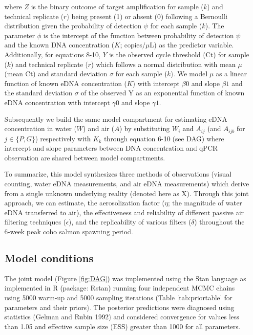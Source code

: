 \documentclass{article}
\begin{document}
where $Z$ is the binary outcome of target amplification for sample ($k$) and technical replicate ($r$) being present (1) or absent (0) following a Bernoulli distribution given the probability of detection $\psi$ for each sample ($k$). The parameter $\phi$ is the intercept of the function between probability of detection $\psi$ and the known DNA concentration ($K$; copies/$\mu$L) as the predictor variable. Additionally, for equations 8-10, $Y$ is the observed cycle threshold (Ct) for sample ($k$) and technical replicate ($r$) which follows a normal distribution with mean $\mu$ (mean Ct) and standard deviation $\sigma$ for each sample ($k$). We model $\mu$ as a linear function of known eDNA concentration ($K$) with intercept $\beta0$ and slope $\beta1$ and the standard deviation $\sigma$ of the observed Y as an exponential function of known eDNA concentration with intercept $\gamma0$ and slope $\gamma1$.

Subsequently we build the same model compartment for estimating eDNA concentration in water ($W$) and air ($A$) by substituting $W_i$ and $A_{ij}$ (and $A_{ijb}$ for $j \in \{P,G\}$) respectively with $K_k$ through equation 6-10 (see DAG) where intercept and slope parameters between DNA concentration and qPCR observation are shared between model compartments.

To summarize, this model synthesizes three methods of observations (visual counting, water eDNA measurements, and air eDNA measurements) which derive from a single unknown underlying reality (denoted here as X). Through this joint approach, we can estimate, the aerosolization factor ($\eta$; the magnitude of water eDNA transferred to air), the effectiveness and reliability of different passive air filtering techniques ($\epsilon$), and the replicability of various filters ($\delta$) throughout the 6-week peak coho salmon spawning period.

\subsection{Model conditions}

The joint model (Figure \ref{fig:DAG}) was implemented using the Stan language as implemented in R (package: Rstan) running four independent MCMC chains using 5000 warm-up and 5000 sampling iterations (Table \ref{tab:priortable} for parameters and their priors). The posterior predictions were diagnosed using statistics (Gelman and Rubin 1992) and considered convergence for values less than 1.05 and effective sample size (ESS) greater than 1000 for all parameters.
\end{document}
